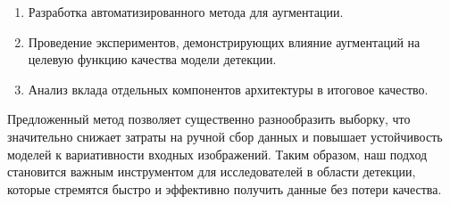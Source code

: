 \begin{enumerate}
    \item Разработка автоматизированного метода для аугментации.
    \item Проведение экспериментов, демонстрирующих влияние аугментаций на целевую функцию качества модели детекции.
    \item Анализ вклада отдельных компонентов архитектуры в итоговое качество.
\end{enumerate}

Предложенный метод позволяет существенно разнообразить выборку, что значительно снижает затраты на ручной сбор данных и повышает устойчивость моделей к вариативности входных изображений. Таким образом, наш подход становится важным инструментом для исследователей в области детекции, которые стремятся быстро и эффективно получить данные без потери качества.
